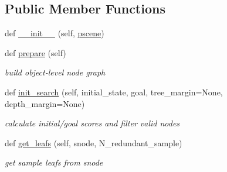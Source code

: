 \subsection*{Public Member Functions}
\begin{DoxyCompactItemize}
\item 
def \hyperlink{classrnb-planning_1_1src_1_1pkg_1_1planning_1_1task_1_1object__a__star_1_1_object_astar_a8e605efb15a636f400111d1c79878376}{\+\_\+\+\_\+init\+\_\+\+\_\+} (self, \hyperlink{classrnb-planning_1_1src_1_1pkg_1_1planning_1_1task_1_1interface_1_1_task_interface_aa7ffb430242b8cf040b951cf2828d598}{pscene})
\item 
\mbox{\label{classrnb-planning_1_1src_1_1pkg_1_1planning_1_1task_1_1object__a__star_1_1_object_astar_ab3c9999665f478d3734959ecf9f08821}} 
def \hyperlink{classrnb-planning_1_1src_1_1pkg_1_1planning_1_1task_1_1object__a__star_1_1_object_astar_ab3c9999665f478d3734959ecf9f08821}{prepare} (self)
\begin{DoxyCompactList}\small\item\em build object-\/level node graph \end{DoxyCompactList}\item 
\mbox{\label{classrnb-planning_1_1src_1_1pkg_1_1planning_1_1task_1_1object__a__star_1_1_object_astar_a5ee2bbae73a7e1f2d2178fda4db5679e}} 
def \hyperlink{classrnb-planning_1_1src_1_1pkg_1_1planning_1_1task_1_1object__a__star_1_1_object_astar_a5ee2bbae73a7e1f2d2178fda4db5679e}{init\+\_\+search} (self, initial\+\_\+state, goal, tree\+\_\+margin=None, depth\+\_\+margin=None)
\begin{DoxyCompactList}\small\item\em calculate initial/goal scores and filter valid nodes \end{DoxyCompactList}\item 
def \hyperlink{classrnb-planning_1_1src_1_1pkg_1_1planning_1_1task_1_1object__a__star_1_1_object_astar_a2cfff333be0d1e6f77f2474d65a80e21}{get\+\_\+leafs} (self, snode, N\+\_\+redundant\+\_\+sample)
\begin{DoxyCompactList}\small\item\em get sample leafs from snode \end{DoxyCompactList}\item 
\mbox{\label{classrnb-planning_1_1src_1_1pkg_1_1planning_1_1task_1_1object__a__star_1_1_object_astar_a6ad402fb411456cc3adcd8bc56fc2592}} 

\end{DoxyCompactItemize}
